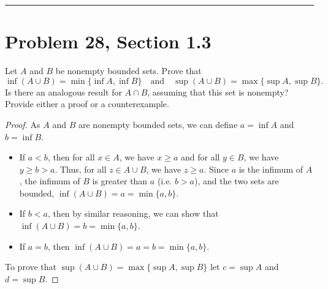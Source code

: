 \documentclass[12pt]{article}
\author{Kiran Jones \\
  \texttt{kiran.p.jones.27@dartmouth.edu}}
\date{Due: July 16, 2025}
\begin{document}
  \maketitle
  \thispagestyle{empty}
  \noindent
  \rule{\linewidth}{0.4pt}
  \newpage
  
  
  \section*{Problem 28, Section 1.3}
  \setcounter{page}{1}
  Let $A$ and $B$ be nonempty bounded sets. Prove that
  \[
    \inf(A \cup B) = \min\{\inf A, \inf B\} \quad \text{and} \quad \sup(A \cup B) = \max\{\sup A, \sup B\}.
  \]
  Is there an analogous result for $A \cap B$, assuming that this set is nonempty? Provide either a proof or a counterexample.

  \begin{proof}
    As $A$ and $B$ are nonempty bounded sets, we can define $a = \inf A$ and $b = \inf B$.
    \begin{itemize}
      \item If $a < b$, then for all $x \in A$, we have $x \geq a$ and for all $y \in B$, we have $y \geq b > a$. Thus, for all $z \in A \cup B$, we have $z \geq a$. Since $a$ is the infimum of $A$, the infimum of $B$ is greater than $a$ (i.e. $b > a$), and the two sets are bounded, $\inf(A \cup B) = a = \min\{a, b\}$.
      \item If $b < a$, then by similar reasoning, we can show that $\inf(A \cup B) = b = \min\{a, b\}$.
      \item If $a = b$, then $\inf(A \cup B) = a = b = \min\{a, b\}$.
    \end{itemize}
    To prove that $\sup(A \cup B) = \max\{\sup A, \sup B\}$ let $c = \sup A$ and $d = \sup B$.


\end{proof}
\end{document}
